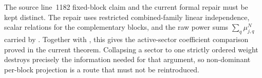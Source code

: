 \documentclass{article}
\begin{document}
The source line~1182 fixed-block claim and the current formal repair must be
kept distinct. The repair uses restricted combined-family linear independence,
scalar relations for the complementary blocks, and the raw power sums
$\sum_q\mu_{j,q}^N$ carried by . Together with
, this gives
the active-sector coefficient comparison proved in the current theorem.
Collapsing a sector to one strictly ordered weight destroys precisely the
information needed for that argument, so non-dominant per-block projection is
a route that must not be reintroduced.



\end{document}
